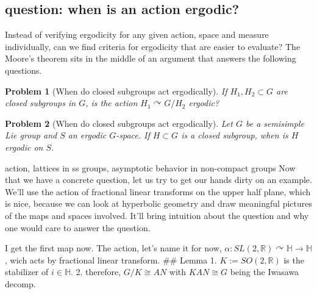 \documentclass[
  12pt
]{article}
\theoremstyle{break}
\newtheorem*{problem}{Problem}
\theoremstyle{plain}
\newcommand{\G}{\ensuremath{G}\xspace}
\begin{document}
  \hypertarget{question-when-is-an-action-ergodic}{%
  \subsection{question: when is an action
  ergodic?}\label{question-when-is-an-action-ergodic}}

  Instead of verifying ergodicity for any given action, space and measure
  individually, can we find criteria for ergodicity that are easier to
  evaluate? The Moore's theorem sits in the middle of an argument that
  answers the following questions.



  \begin{problem}[When do closed subgroups act ergodically]
    If $H_1, H_2 \subset G$ are closed subgroups in \G, is the action $H_1\curvearrowright G/H_2$ ergodic?
  \end{problem}

  \begin{problem}[When do closed subgroups act ergodically]
    Let \G be a semisimple Lie group and $S$ an ergodic \G-space. If $H\subset G$ is a closed subgroup, when is $H$ ergodic on $S$.
  \end{problem}


  action, lattices in ss groups, asymptotic behavior in non-compact groups
  \cite{howe79}
  Now that we have a concrete question, let us try to get our hands dirty
  on an example. We'll use the action of fractional linear transforms on
  the upper half plane, which is nice, because we can look at hyperbolic
  geometry and draw meaningful pictures of the maps and spaces involved.
  It'll bring intuition about the question and why one would care to
  answer the question.

  I get the first map now. The action, let's name it for now,
  $\alpha : SL(2, \mathbb{R}) \curvearrowright \mathbb{H} \rightarrow \mathbb{H}$,
  wich acts by fractional linear transform. \#\# Lemma 1.
  $K:= SO(2, \mathbb{R})$ is the stabilizer of $i \in \mathbb{H}$. 2.
  therefore, $G/K \cong AN$ with $KAN \cong G$ being the Iwasawa
  decomp.
\end{document}
